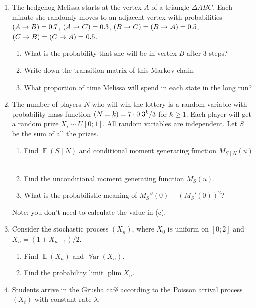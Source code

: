 \documentclass[12pt]{article}
\DeclareMathOperator{\Var}{\mathbb{V}ar}
\let\P\relax
\DeclareMathOperator{\P}{\mathbb{P}}
\DeclareMathOperator{\plim}{\mathrm{plim}}
\DeclareMathOperator{\E}{\mathbb{E}}
\begin{document}
\begin{enumerate}
  \item The hedgehog Melissa starts at the vertex $A$ of a triangle $\Delta ABC$.
  Each minute she randomly moves to an adjacent vertex with probabilities $\P(A \to B) = 0.7$, 
  $\P(A \to C) = 0.3$, $\P(B \to C) = \P(B \to A) = 0.5$,  $\P(C \to B) = \P(C \to A) = 0.5$.

  \begin{enumerate}
    \item What is the probability that she will be in vertex $B$ after 3 steps?
    \item Write down the transition matrix of this Markov chain. 
    \item What proportion of time Melissa will spend in each state in the long run?
  \end{enumerate}
  
  \item The number of players $N$ who will win the lottery
  is a random variable with probability mass function $\P(N = k) = 7\cdot 0.3^k / 3$ for $k\geq 1$.
  Each player will get a random prize $X_i \sim U[0;1]$.
  All random variables are independent. 
  Let $S$ be the sum of all the prizes. 

  \begin{enumerate}
    \item Find $\E(S \mid N)$ and conditional moment generating function $M_{S\mid N}(u)$.
    \item Find the unconditional moment generating function $M_S(u)$.
    \item What is the probabilistic meaning of $M_S''(0) - (M_S'(0))^2$? 
  \end{enumerate}

  Note: you don't need to calculate the value in (c). 
  
  \item Consider the stochastic process $(X_n)$, where $X_0$ is uniform on $[0;2]$ and
  $X_n = (1 + X_{n-1}) / 2$.

  \begin{enumerate}
    \item Find $\E(X_n)$ and $\Var(X_n)$.
    \item Find the probability limit $\plim X_n$.
  \end{enumerate}
  
  \item Students arrive in the Grusha café according to the Poisson arrival process $(X_t)$ 
  with constant rate $\lambda$. 


\end{enumerate}
\end{document}
